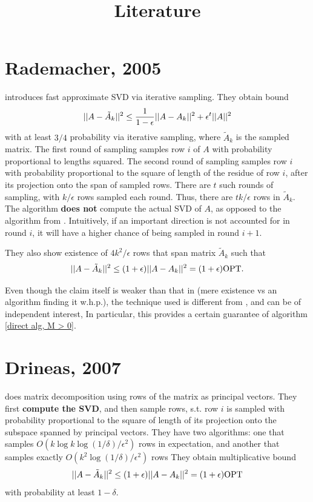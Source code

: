 \documentclass{article}
\title{Literature}
\begin{document}
\maketitle

\section{Rademacher, 2005}
\cite{rademacher2005matrix} introduces fast approximate SVD via iterative sampling. They obtain bound
$$||A - \tilde{A}_k||^2 \leq \frac{1}{1-\epsilon}||A - A_k||^2 + \epsilon^t ||A||^2$$
with at least $3/4$ probability via iterative sampling, where $\tilde{A}_k$ is the sampled matrix. The first round of sampling samples row $i$ of $A$ with probability proportional to lengths squared. The second round of sampling samples row $i$ with probability proportional to the square of length of the residue of row $i$, after its projection onto the span of sampled rows. There are $t$ such rounds of sampling, with $k/\epsilon$ rows sampled each round. Thus, there are $tk/\epsilon$ rows in $\tilde{A}_k$. The algorithm \textbf{does not} compute the actual SVD of $A$, as opposed to the algorithm from \cite{drineas2007relativeerror}. Intuitively, if an important direction is not accounted for in round $i$, it will have a higher chance of being sampled in round $i+1$.

They also show existence of $4k^2/\epsilon$ rows that span matrix $\tilde{A}_k$ such that
$$||A - \tilde{A}_k||^2 \leq (1+\epsilon)||A - A_k||^2 = (1+\epsilon)\text{OPT}.$$

Even though the claim itself is weaker than that in \cite{drineas2007relativeerror} (mere existence vs an algorithm finding it w.h.p.), the technique used is different from \cite{drineas2007relativeerror}, and can be of independent interest, In particular, this provides a certain guarantee of algorithm \ref{direct alg, M > 0}.

\section{Drineas, 2007}
\cite{drineas2007relativeerror} does matrix decomposition using rows of the matrix as principal vectors. They first \textbf{compute the SVD}, and then sample rows, s.t. row $i$ is sampled with probability proportional to the square of length of its projection onto the subspace spanned by principal vectors. They have two algorithms: one that samples $O(k\log k \log(1/\delta)/\epsilon^2)$ rows in expectation, and another that samples exactly $O(k^2\log(1/\delta)/\epsilon^2)$ rows
They obtain multiplicative bound
$$||A - \tilde{A}_k||^2 \leq (1+\epsilon)||A - A_k||^2 = (1+\epsilon)\text{OPT}$$ with probability at least $1-\delta$.
\end{document}
